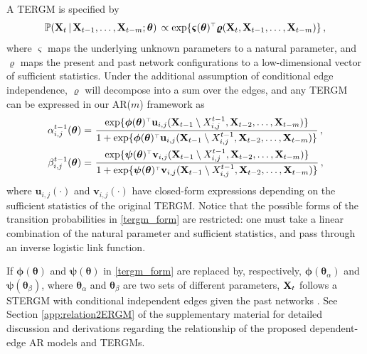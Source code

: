 \documentclass[12pt]{article}
\newcommand{\bvarsigma}{\boldsymbol \varsigma}
\newcommand{\bvarrho}{\boldsymbol \varrho}
\newcommand{\bpsi}{\boldsymbol \psi}
\newcommand{\bphi}{\boldsymbol \phi}
\newcommand{\btheta}{\boldsymbol \theta}
\def\T{{\scriptscriptstyle \top} }
\newcommand{\bu}{{\mathbf u}}
\newcommand{\bv}{{\mathbf v}}
\newcommand{\bX}{{\bf X}}
\newcommand{\0}{{\bf 0}}
\begin{document}
A TERGM \citep{hanneke2010, krivitsky2014} is specified by
\begin{equation*}
  \mathbb{P}({\bf X}_t \,|\, {\bf X}_{t-1}, \ldots, {\bf X}_{t-m} ; \btheta)\, \propto \exp\{ \bvarsigma(\btheta)^{\T} \bvarrho({\bf X}_t, {\bf X}_{t-1}, \ldots, {\bf X}_{t-m})\}\,,
\end{equation*}
where $\bvarsigma$ maps the underlying unknown parameters to a natural parameter, and $\bvarrho$ maps the present and past network configurations to a low-dimensional vector of sufficient statistics.
Under the additional assumption of conditional edge independence, $\bvarrho$ will decompose into a sum over the edges, and any TERGM can be expressed in our AR($m$) framework as
\begin{equation} \label{tergm_form}
\begin{split}
\alpha_{i,j}^{t-1}(\btheta) =&~ \frac{\exp\{\bphi(\btheta)^{\T} \bu_{i,j}({\bf X}_{t-1}
\setminus X_{i,j}^{t-1}, {\bf X}_{t-2}, \ldots, {\bf X}_{t-m} )\} }{
1+ \exp\{\bphi(\btheta)^{\T} \bu_{i,j}({\bf X}_{t-1} \setminus X_{i,j}^{t-1}, {\bf
X}_{t-2}, \ldots, {\bf X}_{t-m} )\}}\,,  \\
\beta_{i,j}^{t-1}(\btheta) =&~ \frac{\exp\{\bpsi(\btheta)^{\T} \bv_{i,j}({\bf X}_{t-1} \setminus X_{i,j}^{t-1}, {\bf X}_{t-2}, \ldots, {\bf X}_{t-m} )\}}
{1+ \exp\{\bpsi(\btheta)^{\T} \bv_{i,j}({\bf X}_{t-1} \setminus X_{i,j}^{t-1}, {\bf X}_{t-2}, \ldots, {\bf X}_{t-m} )\}}\,, 
\end{split}
\end{equation}
where $\bu_{i,j}(\cdot)$ and $\bv_{i,j}(\cdot)$ have closed-form expressions depending on the sufficient statistics of the original TERGM. 
Notice that the possible forms of the transition probabilities in \eqref{tergm_form} are restricted: one must take a linear combination of the natural parameter and sufficient statistics, and pass through an inverse logistic link function.

If $\bphi(\btheta)$ and $\bpsi(\btheta)$ in \eqref{tergm_form} are replaced by, respectively, 
$\bphi(\btheta_\alpha)$ and $\bpsi(\btheta_\beta)$, where $\btheta_\alpha$
and $\btheta_\beta$ are two sets of different parameters, $\bX_t$ follows a  STERGM with conditional independent
edges given the past networks \citep{krivitsky2014}. See
 Section \ref{app:relation2ERGM} of the supplementary material for detailed discussion and derivations regarding the relationship of the proposed dependent-edge AR models and TERGMs. 

\vspace{-0.2cm}
\end{document}
